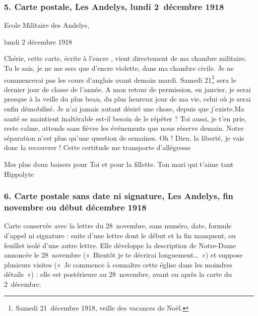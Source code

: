 \subsubsection*{5. Carte postale, Les Andelys, lundi 2~décembre 1918}

\begin{LJlettre}
Ecole Militaire des Andelys,

lundi 2 décembre 1918

Chérie, cette carte, écrite à l'encre , vient directement de ma chambre militaire. Tu le sais, je ne me sers que d'encre violette, dans ma chambre civile. Je ne commencerai pas les cours d'anglais avant demain mardi. Samedi 21\footnote{Samedi 21~décembre 1918, veille des vacances de Noël.} sera le dernier jour de classe de l'année. A mon retour de permission, en janvier, je serai presque à la veille du plus beau, du plus heureux jour de ma vie, celui où je serai enfin démobilisé. Je n'ai jamais autant désiré une chose, depuis que j'existe.\quad Ma santé se maintient inaltérable est-il besoin de le répéter ? Toi aussi, je t'en prie, reste calme, attends sans fièvre les événements que nous réserve demain. Notre séparation n'est plus qu'une question de semaines. Oh ! Dieu, la liberté, je vais donc la recouvrer ! Cette certitude me transporte d'allégresse

Mes plus doux baisers pour Toi et pour la fillette. Ton mari qui t'aime tant Hippolyte
\end{LJlettre}

\subsubsection*{6. Carte postale sans date ni signature, Les Andelys, fin novembre ou début décembre 1918}

Carte conservée avec la lettre du 28~novembre, sans numéro, date, formule d'appel ni signature : suite d'une lettre dont le début et la fin manquent, ou feuillet isolé d'une autre lettre. Elle développe la description de Notre-Dame annoncée le 28~novembre («~Bientôt je te décrirai longuement…~») et suppose plusieurs visites («~Je commence à connaître cette église dans les moindres détails~») : elle est postérieure au 28~novembre, avant ou après la carte du 2~décembre.

